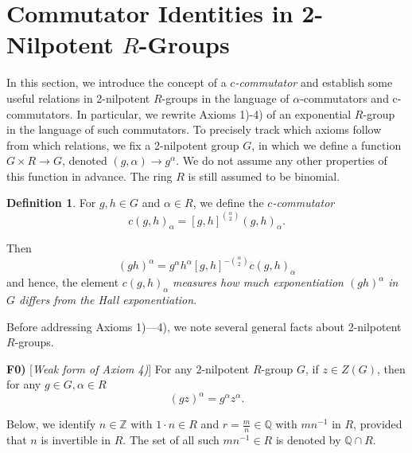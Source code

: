 \documentclass[11pt]{article}
\theoremstyle{definition}
\newtheorem{definition}{Definition}[section]
\begin{document}

\section{Commutator Identities in 2-Nilpotent \texorpdfstring{$R$}{R}-Groups}
\label{sec:commutators}

In this section, we introduce the concept of a \emph{$c$-commutator} and establish some useful relations in 2-nilpotent $R$-groups in the language of $\alpha$-commutators and c-commutators. In particular, we rewrite Axioms 1)-4) of an exponential $R$-group in the language of such commutators. To precisely track which axioms follow from which relations, we fix a 2-nilpotent group $G$, in which we define a function $G\times R \to G$, denoted $(g,\alpha) \to g^\alpha$. We do not assume any other properties of this function in advance. The ring $R$ is still assumed to be binomial.

\begin{definition}
For $g,h \in G$ and $\alpha \in R$, we define the \emph{$c$-commutator}
\begin{equation} \label{eq:def-c-comm}
c(g,h)_\alpha = [g,h]^{\binom{\alpha}{2}}(g,h)_\alpha.
\end{equation}

\end{definition}
Then
\begin{equation} \label{eq:exp-c-comm}
(gh)^\alpha = g^\alpha h^\alpha [g,h]^{-\binom{\alpha}{2}} c(g,h)_\alpha
\end{equation}
and hence, the element $c(g,h)_\alpha$ \emph{measures how much exponentiation  $(gh)^\alpha$ in $G$ differs from the Hall exponentiation.}

Before addressing Axioms 1)---4), we note several general facts about 2-nilpotent $R$-groups.

\medskip
\noindent
{\bf F0)} [{\it Weak form of Axiom 4)}] For any 2-nilpotent $R$-group $G$, if $z \in Z(G)$, then for any $g \in G, \alpha \in R$
\begin{equation} \label{eq:F0}
(gz)^\alpha = g^\alpha z^\alpha.
\end{equation}

\medskip
Below, we identify $n \in \mathbb{Z}$ with $1\cdot n \in R$ and $r = \frac{m}{n} \in \mathbb{Q}$ with $mn^{-1}$ in $R$, provided that $n$ is invertible in $R$. The set of all such $mn^{-1} \in R$ is denoted by $\mathbb{Q} \cap R$.
\end{document}
